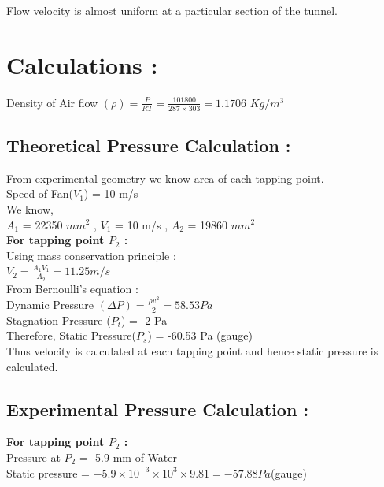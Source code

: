\documentclass[12pt,a4paper]{article}
\begin{document}
Flow velocity is almost uniform at a particular section of the tunnel.













\section{Calculations :}

Density of Air flow $(\rho) = \frac{P}{RT} = \frac{101800}{287 \times 303} = 1.1706$ $Kg/m^{3}$
\subsection{Theoretical Pressure Calculation :}


From experimental geometry we know area of each tapping point.\\
Speed of Fan($V_1$) = 10 m/s \\
We know,\\
$A_1$ = 22350 $mm^{2}$  , $V_1$ = 10 m/s , $A_2$ = 19860 $mm^{2}$ \\

\textbf{For tapping point $P_2$ :} \\
Using mass conservation principle : \\
$V_2 = \frac{A_1 V_1}{A_2} = 11.25 m/s $ \\
From Bernoulli's equation : \\
Dynamic Pressure $(\Delta P) = \frac{\rho v^{2}}{2} = 58.53 Pa$\\
Stagnation Pressure ($P_t$) = -2 Pa \\
Therefore, Static Pressure($P_s$) = -60.53 Pa (gauge) \\

Thus velocity is calculated at each tapping point and hence static pressure is calculated.


\subsection{Experimental Pressure Calculation :}
\textbf{For tapping point $P_2$ :}\\
Pressure at $P_2$ = -5.9 mm of Water\\
Static pressure = $ -5.9 \times 10^{-3} \times 10^{3} \times 9.81 = -57.88 Pa$(gauge)
\end{document}
